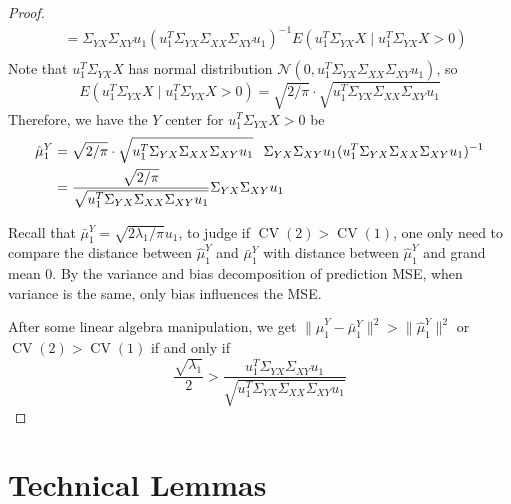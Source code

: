 \documentclass[12pt]{article}
\newcommand{\CV}{\operatorname{CV}}
\begin{document}
\begin{proof}
\begin{align}
 		      & =  \Sigma_{YX}\Sigma_{XY}u_1 (u^T_1\Sigma_{YX} \Sigma_{XX} \Sigma_{XY} u_1)^{-1} E(u^T_1\Sigma_{YX}X \mid u^T_1\Sigma_{YX}X>0) \\ \nonumber
\end{align}
Note that $u^T_1\Sigma_{YX}X$ has normal distribution $\mathcal{N} \left( 0, u^T_1\Sigma_{YX} \Sigma_{XX} \Sigma_{XY} u_1\right)$, so
\[
E(u^T_1\Sigma_{YX}X \mid u^T_1\Sigma_{YX}X>0) = \sqrt{2/\pi}\cdot\sqrt{u^T_1\Sigma_{YX} \Sigma_{XX} \Sigma_{XY} u_1}
\]
Therefore, we have the $Y$ center for $u^T_1\Sigma_{YX}X>0$ be
\begin{align*}
\hat{\mu}^Y_1 &= \sqrt{2/\pi}\cdot\sqrt{u^T_1\Sigma_{YX} \Sigma_{XX} \Sigma_{XY} u_1} \hspace{0.1in} \Sigma_{YX}\Sigma_{XY}u_1 (u^T_1\Sigma_{YX} \Sigma_{XX} \Sigma_{XY} u_1)^{-1} \\
&=\frac{\sqrt{2/\pi}}{\sqrt{u^T_1\Sigma_{YX} \Sigma_{XX} \Sigma_{XY} u_1}} \Sigma_{YX}\Sigma_{XY}u_1
\end{align*} 
 
Recall that $\bar{\mu}^Y_1 =\sqrt{2 \lambda_1/\pi}u_1$, to judge if $\CV(2) >
\CV(1)$, one only need to compare the distance between  $\hat{\mu}^Y_1$  and
$\bar{\mu}^Y_1$ with distance between  $\hat{\mu}^Y_1$ and grand mean $0$. By
the variance and bias decomposition of prediction MSE, when variance is the
same, only bias influences the MSE. 

After some linear algebra manipulation, we get
$\|\hat{\mu}^Y_1 - \bar{\mu}^Y_1\|^2 > \|\hat{\mu}^Y_1\|^2$ or $\CV(2) >
\CV(1)$ if and only if
\[
 \frac{\sqrt{\lambda_1}}{2} > \frac{u^T_1\Sigma_{YX}\Sigma_{XY}u_1}{\sqrt{u^T_1\Sigma_{YX} \Sigma_{XX} \Sigma_{XY} u_1}} 
\]
\end{proof}


\section{Technical Lemmas}
\label{app:technical-lemmas}
\end{document}
